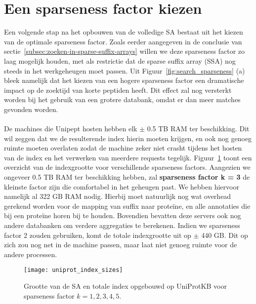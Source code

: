 \section{Een sparseness factor kiezen}
Een volgende stap na het opbouwen van de volledige SA bestaat uit het kiezen van de optimale sparseness factor.
Zoals eerder aangegeven in de conclusie van sectie~\ref{subsec:zoeken-in-sparse-suffix-arrays} willen we deze sparseness factor zo laag mogelijk houden, met als restrictie dat de sparse suffix array (SSA) nog steeds in het werkgeheugen moet passen.
Uit Figuur~\ref{fig:search_sparseness} (a) bleek namelijk dat het kiezen van een hogere sparseness factor een dramatische impact op de zoektijd van korte peptiden heeft.
Dit effect zal nog versterkt worden bij het gebruik van een grotere databank, omdat er dan meer matches gevonden worden.
\\ \\
De machines die Unipept hosten hebben elk $\pm$ 0.5 TB RAM ter beschikking.
Dit wil zeggen dat we de resulterende index hierin moeten krijgen, en ook nog genoeg ruimte moeten overlaten zodat de machine zeker niet crasht tijdens het hosten van de index en het verwerken van meerdere requests tegelijk.
Figuur~\ref{fig:uniprot_index_size_sparsenessfactors} toont een overzicht van de indexgrootte voor verschillende sparseness factors.
Aangezien we ongeveer 0.5 TB RAM ter beschikking hebben, zal \textbf{sparseness factor k = 3} de kleinste factor zijn die comfortabel in het geheugen past.
We hebben hiervoor namelijk al 322 GB RAM nodig.
Hierbij moet natuurlijk nog wat overhead gerekend worden voor de mapping van suffix naar proteïne, en alle annotaties die bij een proteïne horen bij te houden.
Bovendien bevatten deze servers ook nog andere databanken om verdere aggregaties te berekenen.
Indien we sparseness factor 2 zouden gebruiken, komt de totale indexgrootte uit op $\pm$ 440 GB\@.
Dit op zich zou nog net in de machine passen, maar laat niet genoeg ruimte voor de andere processen.

\begin{figure}[h!]
    \centering
    \texttt{[image: uniprot\_index\_sizes]}
    \caption{Grootte van de SA en totale index opgebouwd op UniProtKB voor sparseness factor $k = 1, 2, 3, 4, 5$.}
    \label{fig:uniprot_index_size_sparsenessfactors}
\end{figure}

